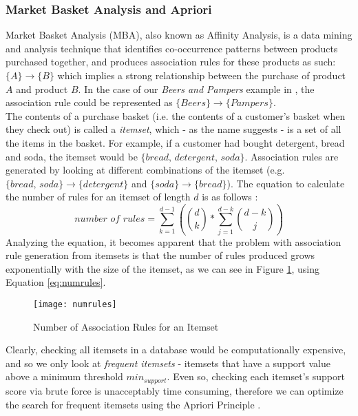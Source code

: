 \documentclass[a4paper,11pt]{article}
\newcommand{\setA}{\{A\}}
\newcommand{\setB}{\{B\}}
\newcommand{\abrule}{\setA\rightarrow\setB}
\begin{document}
\subsubsection{Market Basket Analysis and Apriori}
Market Basket Analysis (MBA), also known as Affinity Analysis, is a data mining and analysis technique that identifies co-occurrence patterns between products purchased together, and produces association rules for these products as such: $\abrule$ which implies a strong relationship between the purchase of product $A$ and product $B$. In the case of our \textit{Beers and Pampers} example in \cite{beers_diapers}, the association rule could be represented as $\{Beers\} \rightarrow \{Pampers\}$.
\\
The contents of a purchase basket (i.e. the contents of a customer's basket when they check out) is called a \textit{itemset}, which - as the name suggests - is a set of all the items in the basket.  For example, if a customer had bought detergent, bread and soda, the itemset would be $\{\textit{bread, detergent, soda}\}$. Association rules are generated by looking at different combinations of the itemset (e.g. $\{\textit{bread, soda}\}\rightarrow\{\textit{detergent}\}$ and $\{\textit{soda}\}\rightarrow\{\textit{bread}\}$). 
The equation \cite{num_rules} to calculate the number of rules for an itemset of length $d$ is as follows :\\
\begin{equation}
\textit{number of rules} = \sum\limits_{k=1}^{d-1} \left(\binom{d}{k} * \sum\limits_{j=1}^{d-k}\binom{d-k}{j}  \right)
\label{eq:numrules}
\end{equation}
Analyzing the equation, it becomes apparent that the problem with association rule generation from itemsets is that the number of rules produced grows exponentially with the size of the itemset, as we can see in Figure \ref{fig:numrules}, using Equation \ref{eq:numrules}.  
\begin{figure}[H]
\centering
\texttt{[image: numrules]}
\caption{Number of Association Rules for an Itemset}
\label{fig:numrules}
\end{figure}
Clearly, checking all itemsets in a database would be computationally expensive, and so we only look at \textit{frequent itemsets} - itemsets that have a support value above a minimum threshold $\textit{min}_{\textit{support}}$. Even so, checking each itemset's support score via brute force is unacceptably time consuming, therefore we can optimize the search for frequent itemsets using the Apriori Principle \cite{apriori}.
\end{document}
